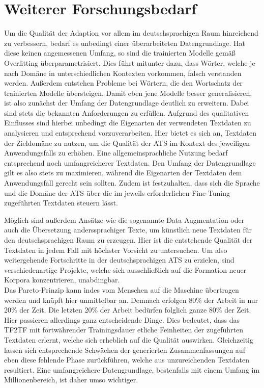 \section{Weiterer Forschungsbedarf}
\noindent
Um die Qualität der Adaption vor allem im deutschsprachigen Raum hinreichend zu verbessern, bedarf es unbedingt einer überarbeiteten Datengrundlage. Hat diese keinen angemessenen Umfang, so sind die trainierten Modelle gemäß Overfitting überparametrisiert. Dies führt mitunter dazu, dass Wörter, welche je nach Domäne in unterschiedlichen Kontexten vorkommen, falsch verstanden werden. Außerdem entstehen Probleme bei Wörtern, die den Wortschatz der trainierten Modelle übersteigen. Damit eben jene Modelle besser generalisieren, ist also zunächst der Umfang der Datengrundlage deutlich zu erweitern. Dabei sind stets die bekannten Anforderungen zu erfüllen. Aufgrund des qualitativen Einflusses sind hierbei unbedingt die Eigenarten der verwendeten Textdaten zu analysieren und entsprechend vorzuverarbeiten. Hier bietet es sich an, Textdaten der Zieldomäne zu nutzen, um die Qualität der \ac{ATS} im Kontext des jeweiligen Anwendungsfalls zu erhöhen. Eine allgemeinsprachliche Nutzung bedarf entsprechend noch umfangreicherer Textdaten. Den Umfang der Datengrundlage gilt es also stets zu maximieren, während die Eigenarten der Textdaten dem Anwendungsfall gerecht sein sollten. Zudem ist festzuhalten, dass sich die Sprache und die Domäne der \ac{ATS} über die im jeweils erforderlichen Fine-Tuning zugeführten Textdaten steuern lässt.
\newpage

\noindent
Möglich sind außerdem Ansätze wie die sogenannte Data Augmentation oder auch die Übersetzung anderssprachiger Texte, um künstlich neue Textdaten für den deutschsprachigen Raum zu erzeugen. Hier ist die entstehende Qualität der Textdaten in jedem Fall mit höchster Vorsicht zu untersuchen. Um also weitergehende Fortschritte in der deutschsprachigen \ac{ATS} zu erzielen, sind verschiedenartige Projekte, welche sich ausschließlich auf die Formation neuer Korpora konzentrieren, unabdingbar.\\

\noindent
Das Pareto-Prinzip kann indes vom Menschen auf die Maschine übertragen werden und knüpft hier unmittelbar an. Demnach erfolgen 80\% der Arbeit in nur 20\% der Zeit. Die letzten 20\% der Arbeit bedürfen folglich ganze 80\% der Zeit. Hier passieren allerdings ganz entscheidende Dinge. Dies bedeutet, dass das \ac{TF2TF} mit fortwährender Trainingsdauer etliche Feinheiten der zugeführten Textdaten erlernt, welche sich erheblich auf die Qualität auswirken. Gleichzeitig lassen sich entsprechende Schwächen der generierten Zusammenfassungen auf eben diese fehlende Phase zurückführen, welche aus unzureichenden Textdaten resultiert. Eine umfangreichere Datengrundlage, bestenfalls mit einem Umfang im Millionenbereich, ist daher umso wichtiger.\\

